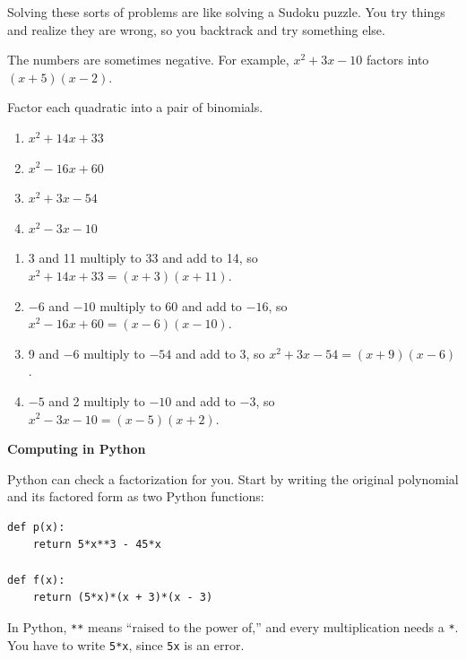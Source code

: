 Solving these sorts of problems are like solving a Sudoku puzzle. You
try things and realize they are wrong, so you backtrack and try
something else.

The numbers are sometimes negative. For example, $x^2 + 3x - 10$ factors into $(x + 5)(x - 2)$.

\begin{Exercise}[title={Factoring quadratics}, label=factorquadratics]
Factor each quadratic into a pair of binomials.
\begin{enumerate}
\item $x^2 + 14x + 33$
\item $x^2 - 16x + 60$
\item $x^2 + 3x - 54$
\item $x^2 - 3x - 10$
\end{enumerate}
\end{Exercise}
\begin{Answer}[ref=factorquadratics]
\begin{enumerate}
\item 3 and 11 multiply to 33 and add to 14, so
  $x^2 + 14x + 33 = (x + 3)(x + 11)$.
\item $-6$ and $-10$ multiply to 60 and add to $-16$, so
  $x^2 - 16x + 60 = (x - 6)(x - 10)$.
\item 9 and $-6$ multiply to $-54$ and add to 3, so
  $x^2 + 3x - 54 = (x + 9)(x - 6)$.
\item $-5$ and 2 multiply to $-10$ and add to $-3$, so
  $x^2 - 3x - 10 = (x - 5)(x + 2)$.
\end{enumerate}
\end{Answer}

\textbf{Computing in Python}

Python can check a factorization for you. Start by writing the
original polynomial and its factored form as two Python functions:

\begin{verbatim}
def p(x):
    return 5*x**3 - 45*x

def f(x):
    return (5*x)*(x + 3)*(x - 3)
\end{verbatim}

In Python, \texttt{**} means ``raised to the power of,'' and
every multiplication needs a \texttt{*}. You have to write
\texttt{5*x}, since \texttt{5x} is an error.

